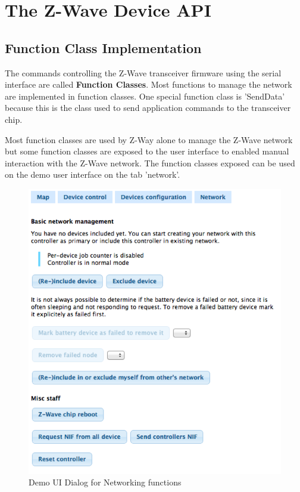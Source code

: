 \section{The Z-Wave Device API}

\subsection{Function Class Implementation}

The commands controlling the Z-Wave transceiver firmware using the serial interface are called {\bf Function Classes}. Most functions to manage the network 
are implemented in function classes. One special function class is 'SendData' because this is the class used to send application commands to the transceiver chip.

Most function classes are used by Z-Way alone to manage the Z-Wave network but some function classes are exposed to the user interface to enabled manual 
interaction with the Z-Wave network. The function classes exposed can be used on the demo user interface on the tab 'network'.


\begin{figure} 
\begin{center}
\includegraphics[scale=0.8]{pics/network1.png}
\caption{Demo UI Dialog for Networking functions}
\label{c1:network1} 
\end{center} \end{figure}


